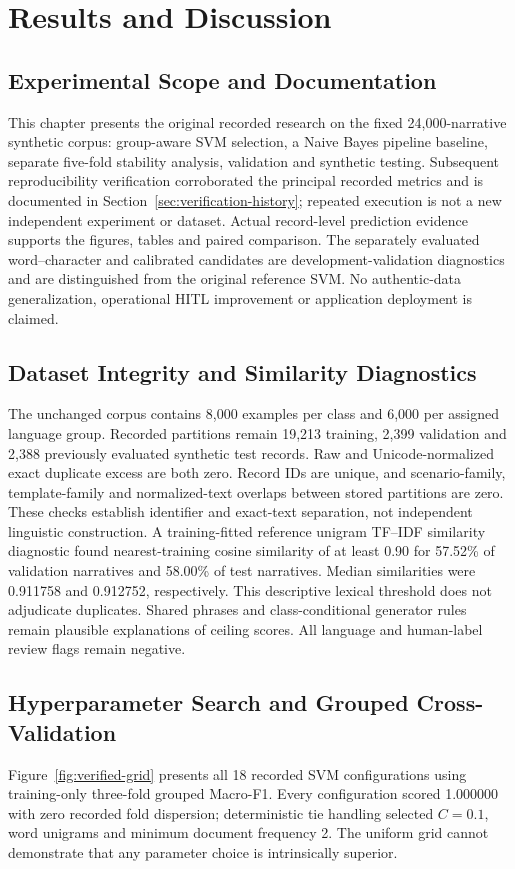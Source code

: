 \chapter{Results and Discussion}
\section{Experimental Scope and Documentation}
This chapter presents the original recorded research on the fixed 24,000-narrative synthetic corpus: group-aware SVM selection, a Naive Bayes pipeline baseline, separate five-fold stability analysis, validation and synthetic testing. Subsequent reproducibility verification corroborated the principal recorded metrics and is documented in Section~\ref{sec:verification-history}; repeated execution is not a new independent experiment or dataset. Actual record-level prediction evidence supports the figures, tables and paired comparison. The separately evaluated word--character and calibrated candidates are development-validation diagnostics and are distinguished from the original reference SVM. No authentic-data generalization, operational HITL improvement or application deployment is claimed.

\section{Dataset Integrity and Similarity Diagnostics}
The unchanged corpus contains 8,000 examples per class and 6,000 per assigned language group. Recorded partitions remain 19,213 training, 2,399 validation and 2,388 previously evaluated synthetic test records. Raw and Unicode-normalized exact duplicate excess are both zero. Record IDs are unique, and scenario-family, template-family and normalized-text overlaps between stored partitions are zero. These checks establish identifier and exact-text separation, not independent linguistic construction.
A training-fitted reference unigram TF--IDF similarity diagnostic found nearest-training cosine similarity of at least 0.90 for 57.52\% of validation narratives and 58.00\% of test narratives. Median similarities were 0.911758 and 0.912752, respectively. This descriptive lexical threshold does not adjudicate duplicates. Shared phrases and class-conditional generator rules remain plausible explanations of ceiling scores. All language and human-label review flags remain negative.

\section{Hyperparameter Search and Grouped Cross-Validation}
Figure~\ref{fig:verified-grid} presents all 18 recorded SVM configurations using training-only three-fold grouped Macro-F1. Every configuration scored 1.000000 with zero recorded fold dispersion; deterministic tie handling selected $C=0.1$, word unigrams and minimum document frequency 2. The uniform grid cannot demonstrate that any parameter choice is intrinsically superior.

